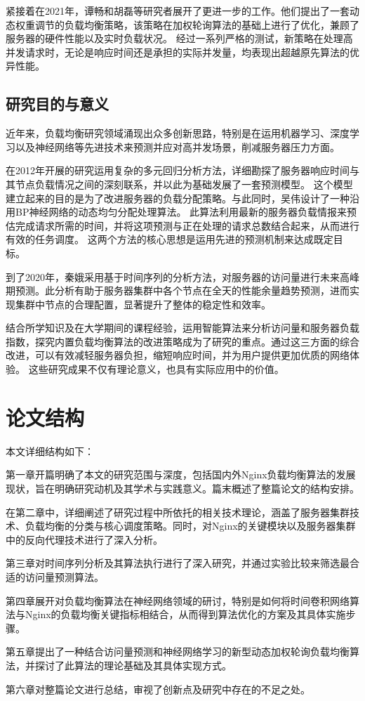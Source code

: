 紧接着在2021年，谭畅和胡磊等研究者展开了更进一步的工作\cite{谭畅2021云中心基于}。他们提出了一套动态权重调节的负载均衡策略，该策略在加权轮询算法的基础上进行了优化，兼顾了服务器的硬件性能以及实时负载状况。
经过一系列严格的测试，新策略在处理高并发请求时，无论是响应时间还是承担的实际并发量，均表现出超越原先算法的优异性能。

\subsection{研究目的与意义}

近年来，负载均衡研究领域涌现出众多创新思路，特别是在运用机器学习、深度学习以及神经网络等先进技术来预测并应对高并发场景，削减服务器压力方面。

在2012年开展的研究运用复杂的多元回归分析方法，详细勘探了服务器响应时间与其节点负载情况之间的深刻联系，并以此为基础发展了一套预测模型。
这个模型建立起来的目的是为了改进服务器的负载分配策略。与此同时，吴伟设计了一种沿用BP神经网络的动态均匀分配处理算法。
此算法利用最新的服务器负载情报来预估完成请求所需的时间，并将这项预测与正在处理的请求总数结合起来，从而进行有效的任务调度。
这两个方法的核心思想是运用先进的预测机制来达成既定目标。

到了2020年，秦娥采用基于时间序列的分析方法，对服务器的访问量进行未来高峰期预测\cite{qbee}。此分析有助于服务器集群中各个节点在全天的性能余量趋势预测，进而实现集群中节点的合理配置，显著提升了整体的稳定性和效率。

结合所学知识及在大学期间的课程经验，运用智能算法来分析访问量和服务器负载指数，探究内置负载均衡算法的改进策略成为了研究的重点。通过这三方面的综合改进，可以有效减轻服务器负担，缩短响应时间，并为用户提供更加优质的网络体验。
这些研究成果不仅有理论意义，也具有实际应用中的价值。
\section{论文结构}

本文详细结构如下：

第一章开篇明确了本文的研究范围与深度，包括国内外Nginx负载均衡算法的发展现状，旨在明确研究动机及其学术与实践意义。篇末概述了整篇论文的结构安排。

在第二章中，详细阐述了研究过程中所依托的相关技术理论，涵盖了服务器集群技术、负载均衡的分类与核心调度策略。同时，对Nginx的关键模块以及服务器集群中的反向代理技术进行了深入分析。

第三章对时间序列分析及其算法执行进行了深入研究，并通过实验比较来筛选最合适的访问量预测算法。

第四章展开对负载均衡算法在神经网络领域的研讨，特别是如何将时间卷积网络算法与Nginx的负载均衡关键指标相结合，从而得到算法优化的方案及其具体实施步骤。

第五章提出了一种结合访问量预测和神经网络学习的新型动态加权轮询负载均衡算法，并探讨了此算法的理论基础及其具体实现方式。

第六章对整篇论文进行总结，审视了创新点及研究中存在的不足之处。
